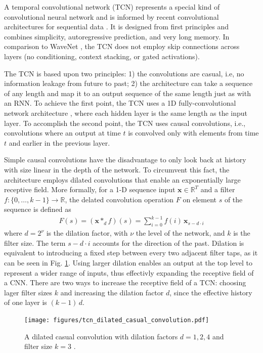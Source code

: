 \documentclass{scrartcl}
\begin{document}
A temporal convolutional network (TCN)  represents a special kind of convolutional neural network and is informed by recent convolutional architectures for sequential data \cite{Bai2018}. It is designed from first principles and combines simplicity, autoregressive prediction, and very long memory. In comparison to WaveNet \cite{Oord2016}, the TCN does not employ skip connections across layers (no conditioning, context stacking, or gated activations).

The TCN is based upon two principles: 1) the convolutions are casual, i.e, no information leakage from future to past; 2) the architecture can take a sequence of any length and map it to an output sequence of the same length just as with an RNN. To achieve the first point, the TCN uses a 1D fully-convolutional network architecture \cite{Long2015}, where each hidden layer is the same length as the input layer. To accomplish the second point, the TCN uses causal convolutions, i.e., convolutions where an output at time $t$ is convolved only with elements from time $t$ and earlier in the previous layer.

Simple causal convolutions have the disadvantage to only look back at history with size linear in the depth of the network. To circumvent this fact, the architecture employs dilated convolutions that enable an exponentially large receptive field. More formally, for a 1-D sequence input $\mathbf x \in \mathbb R^T$ and a filter $f:\{ 0, \dots, k-1\} \rightarrow \mathbb R$, the delated convolution operation $F$ on element $s$ of the sequence is defined as
\begin{align}
F(s) = (\mathbf x *_d f)(s) = \sum_{i=0}^{k-1} f(i) \, \mathbf x_{s-d\cdot i}
\end{align}
where $d = 2^\nu$ is the dilation factor, with $\nu$ the level of the network, and $k$ is the filter size. The term $s-d\cdot i$ accounts for the direction of the past. Dilation is equivalent to introducing a fixed  step between every two adjacent filter taps, as it can be seen in Fig. \ref{fig:dilated_convolutions}. Using larger dilation enables an output at the top level to represent a wider range of inputs, thus effectivly expanding the receptive field of a CNN. There are two ways to increase the receptive field of a TCN: choosing lager filter sizes $k$ and increasing the dilation factor $d$, since the effective history of one layer is $(k-1) \, d$. 
\begin{figure}[htbp]
    \centering
    \texttt{[image: figures/tcn\_dilated\_casual\_convolution.pdf]}
    \caption{A dilated casual convolution with dilation factors $d = 1,2,4$ and filter size $k=3$ \cite{Bai2018}.}
    \label{fig:dilated_convolutions} 
\end{figure}
\end{document}
